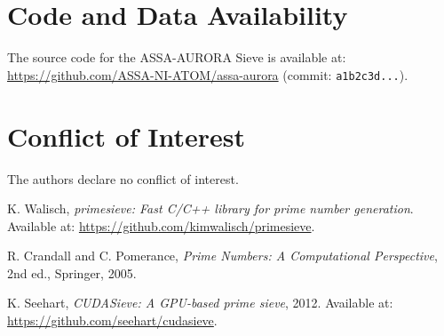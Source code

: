 \documentclass[11pt]{article}
\begin{document}
\section*{Code and Data Availability}
The source code for the ASSA-AURORA Sieve is available at: \url{https://github.com/ASSA-NI-ATOM/assa-aurora} (commit: \texttt{a1b2c3d...}).

\section*{Conflict of Interest}
The authors declare no conflict of interest.

\begin{thebibliography}{9}
K. Walisch, \emph{primesieve: Fast C/C++ library for prime number generation}. Available at: \url{https://github.com/kimwalisch/primesieve}.

R. Crandall and C. Pomerance, \emph{Prime Numbers: A Computational Perspective}, 2nd ed., Springer, 2005.

K. Seehart, \emph{CUDASieve: A GPU-based prime sieve}, 2012. Available at: \url{https://github.com/seehart/cudasieve}.

\end{thebibliography}


\end{document}
